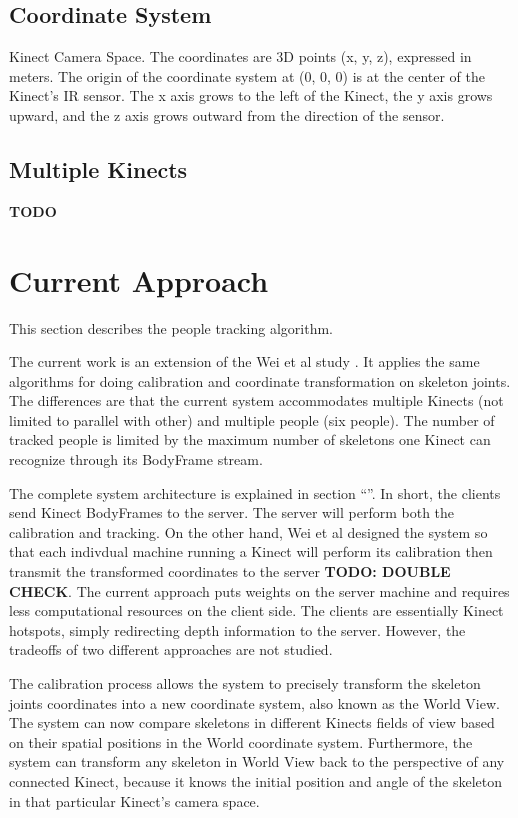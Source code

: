 \documentclass{sigchi}
\begin{document}
\subsection{Coordinate System}

Kinect Camera Space. The coordinates are 3D points (x, y, z), expressed in meters. The origin of the coordinate system at (0, 0, 0) is at the center of the Kinect's IR sensor. The x axis grows to the left of the Kinect, the y axis grows upward, and the z axis grows outward from the direction of the sensor.

\cite{microsoft_kinect_coordinates}

\subsection{Multiple Kinects}

\textbf{TODO}

\section{Current Approach}
\label{sec:current_approach}

This section describes the people tracking algorithm.

The current work is an extension of the Wei et al study \cite{wei_kinect_calibration}. It applies the same algorithms for doing calibration and coordinate transformation on skeleton joints. The differences are that the current system accommodates multiple Kinects (not limited to parallel with other) and multiple people (six people). The number of tracked people is limited by the maximum number of skeletons one Kinect can recognize through its BodyFrame stream.

The complete system architecture is explained in section ``''. In short, the clients send Kinect BodyFrames to the server. The server will perform both the calibration and tracking. On the other hand, Wei et al designed the system so that each indivdual machine running a Kinect will perform its calibration then transmit the transformed coordinates to the server \cite{wei_kinect_calibration} \textbf{TODO: DOUBLE CHECK}. The current approach puts weights on the server machine and requires less computational resources on the client side. The clients are essentially Kinect hotspots, simply redirecting depth information to the server. However, the tradeoffs of two different approaches are not studied.

The calibration process allows the system to precisely transform the skeleton joints coordinates into a new coordinate system, also known as the World View. The system can now compare skeletons in different Kinects fields of view based on their spatial positions in the World coordinate system. Furthermore, the system can transform any skeleton in World View back to the perspective of any connected Kinect, because it knows the initial position and angle of the skeleton in that particular Kinect's camera space.
\end{document}
